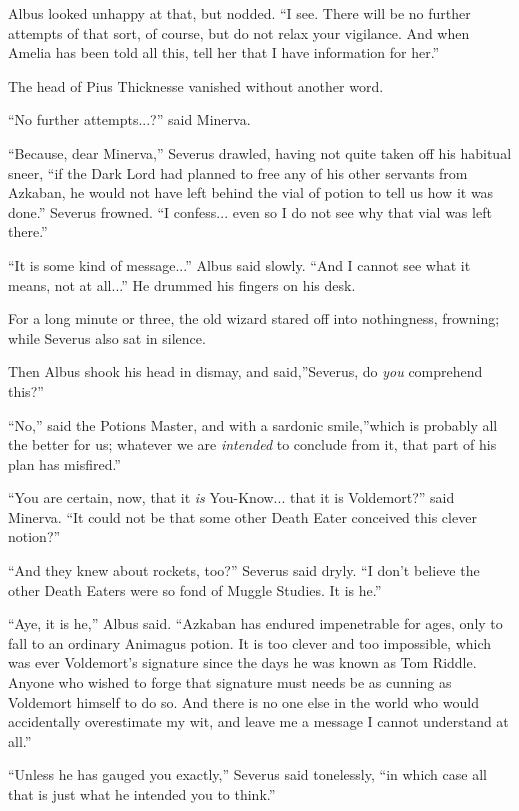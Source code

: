 Albus looked unhappy at that, but nodded. ``I see. There will be no
further attempts of that sort, of course, but do not relax your
vigilance. And when Amelia has been told all this, tell her that I have
information for her.''

The head of Pius Thicknesse vanished without another word.

``No further attempts...?'' said Minerva.

``Because, dear Minerva,'' Severus drawled, having not quite taken off
his habitual sneer, ``if the Dark Lord had planned to free any of his
other servants from Azkaban, he would not have left behind the vial of
potion to tell us how it was done.'' Severus frowned. ``I
confess... even so I do not see why that vial was left there.''

``It is some kind of message...'' Albus said slowly. ``And I cannot
see what it means, not at all...'' He drummed his fingers on his
desk.

For a long minute or three, the old wizard stared off into nothingness,
frowning; while Severus also sat in silence.

Then Albus shook his head in dismay, and said,''Severus, do \emph{you}
comprehend this?''

``No,'' said the Potions Master, and with a sardonic smile,''which is
probably all the better for us; whatever we are \emph{intended} to
conclude from it, that part of his plan has misfired.''

``You are certain, now, that it \emph{is} You-Know... that it is
Voldemort?'' said Minerva. ``It could not be that some other Death Eater
conceived this clever notion?''

``And they knew about rockets, too?'' Severus said dryly. ``I don't
believe the other Death Eaters were so fond of Muggle Studies. It is
he.''

``Aye, it is he,'' Albus said. ``Azkaban has endured impenetrable for
ages, only to fall to an ordinary Animagus potion. It is too clever and
too impossible, which was ever Voldemort's signature since the days he
was known as Tom Riddle. Anyone who wished to forge that signature must
needs be as cunning as Voldemort himself to do so. And there is no one
else in the world who would accidentally overestimate my wit, and leave
me a message I cannot understand at all.''

``Unless he has gauged you exactly,'' Severus said tonelessly, ``in
which case all that is just what he intended you to think.''

